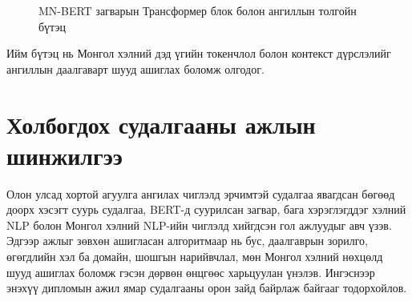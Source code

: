 \begin{figure}[H]
\caption{MN-BERT загварын Трансформер блок болон ангиллын толгойн бүтэц}
\label{fig:mnbert-arch}
\end{figure}

Ийм бүтэц нь Монгол хэлний дэд үгийн токенчлол болон контекст дүрслэлийг
ангиллын даалгаварт шууд ашиглах боломж олгодог.


\section{Холбогдох судалгааны ажлын шинжилгээ}
\label{sec:related-work}

Олон улсад хортой агуулга ангилах чиглэлд эрчимтэй судалгаа явагдсан бөгөөд
доорх хэсэгт суурь судалгаа, BERT-д суурилсан загвар, бага хэрэглэгддэг хэлний
NLP болон Монгол хэлний NLP-ийн чиглэлд хийгдсэн гол ажлуудыг авч үзэв.
Эдгээр ажлыг зөвхөн ашигласан алгоритмаар нь бус, даалгаврын зорилго,
өгөгдлийн хэл ба домайн, шошгын нарийвчлал, мөн Монгол хэлний нөхцөлд шууд
ашиглах боломж гэсэн дөрвөн өнцгөөс харьцуулан үнэлэв. Ингэснээр энэхүү
дипломын ажил ямар судалгааны орон зайд байрлаж байгааг тодорхойлов.

